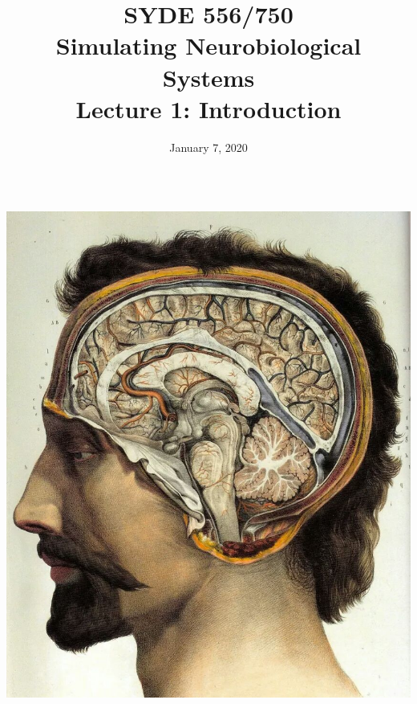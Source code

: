 \documentclass[handout,aspectratio=169]{beamer}
\date{January 7, 2020}
\title{SYDE 556/750 \\ Simulating Neurobiological Systems \\ Lecture 1: Introduction}
\begin{document}
	
\begin{frame}{}
	\vspace{0.5cm}
	\begin{columns}[c]
		\MakeTitle
		\includegraphics[width=\textwidth]{media/jean_baptiste_marc_bourgery_atlas_of_anatomy_human_brain.jpg}
	\end{columns}
\end{frame}
\end{document}
